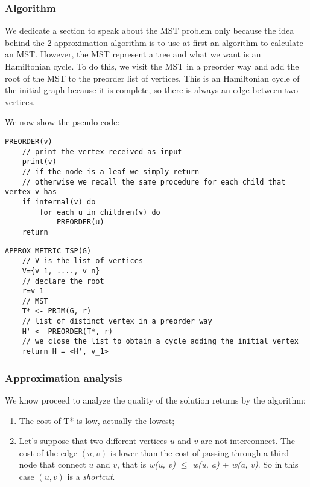 \subsubsection{Algorithm}
We dedicate a section to speak about the MST problem only because the idea behind the 2-approximation algorithm is to use at first an algorithm to calculate an MST. However, the MST represent a tree and what we want is an Hamiltonian cycle. To do this, we visit the MST in a preorder way and add the root of the MST to the preorder list of vertices. This is an Hamiltonian cycle of the initial graph because it is complete, so there is always an edge between two vertices.

We now show the pseudo-code:
\begin{verbatim}
PREORDER(v)
    // print the vertex received as input
    print(v)
    // if the node is a leaf we simply return
    // otherwise we recall the same procedure for each child that vertex v has
    if internal(v) do
        for each u in children(v) do
            PREORDER(u)
    return
\end{verbatim}
\begin{verbatim}
APPROX_METRIC_TSP(G)
    // V is the list of vertices
    V={v_1, ...., v_n}
    // declare the root
    r=v_1
    // MST
    T* <- PRIM(G, r)
    // list of distinct vertex in a preorder way
    H' <- PREORDER(T*, r)
    // we close the list to obtain a cycle adding the initial vertex
    return H = <H', v_1>
\end{verbatim}

\subsubsection{Approximation analysis}
We know proceed to analyze the quality of the solution returns by the algorithm:
\begin{enumerate}
    \item The cost of T* is low, actually the lowest;
    \item Let's suppose that two different vertices $u$ and $v$ are not interconnect. The cost of the edge $(u, v)$ is lower than the cost of passing through a third node that connect $u$ and $v$, that is \textit{w(u, v)} $\leq$ \textit{w(u, a)} +{ \textit{w(a, v)}}. So in this case $(u, v)$ is a \textit{shortcut}.
\end{enumerate}

